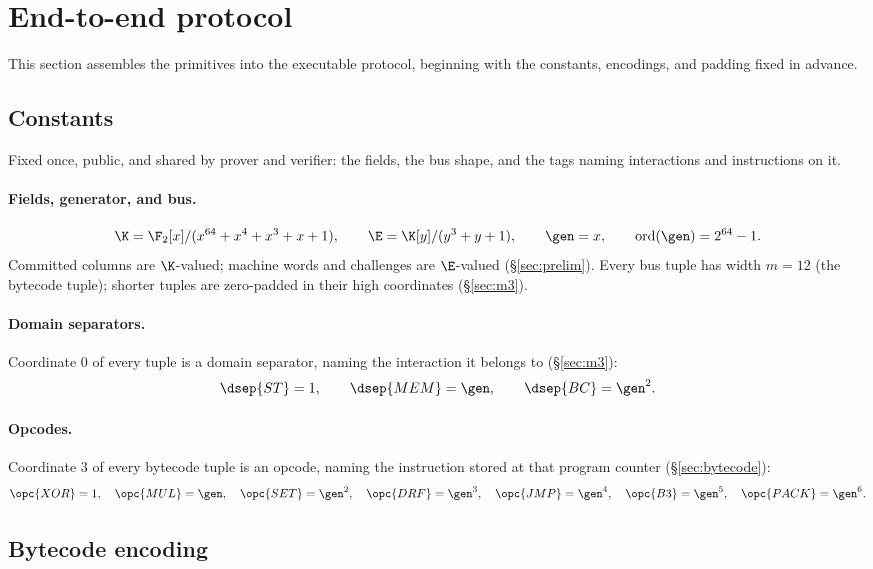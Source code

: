 \section{End-to-end protocol}\label{sec:e2e}

This section assembles the primitives into the executable protocol, beginning with the constants, encodings, and padding fixed in advance.

\subsection{Constants}\label{sec:e2e-const}

Fixed once, public, and shared by prover and verifier: the fields, the bus shape, and the tags naming interactions and instructions on it.

\paragraph{Fields, generator, and bus.}
\[
\K=\F_2[x]/(x^{64}+x^4+x^3+x+1),\qquad
\E=\K[y]/(y^3+y+1),\qquad
\gen=x,\qquad \operatorname{ord}(\gen)=2^{64}-1.
\]
Committed columns are $\K$-valued; machine words and challenges are $\E$-valued (\S\ref{sec:prelim}). Every bus tuple has width $m=12$ (the bytecode tuple); shorter tuples are zero-padded in their high coordinates (\S\ref{sec:m3}).

\paragraph{Domain separators.} Coordinate $0$ of every tuple is a domain separator, naming the interaction it belongs to (\S\ref{sec:m3}):
\[
  \dsep{ST}=1,\qquad \dsep{MEM}=\gen,\qquad \dsep{BC}=\gen^{2}.
\]

\paragraph{Opcodes.} Coordinate $3$ of every bytecode tuple is an opcode, naming the instruction stored at that program counter (\S\ref{sec:bytecode}):
\[
  \opc{XOR}=1,\quad \opc{MUL}=\gen,\quad \opc{SET}=\gen^{2},\quad \opc{DRF}=\gen^{3},\quad \opc{JMP}=\gen^{4},\quad \opc{B3}=\gen^{5},\quad \opc{PACK}=\gen^{6}.
\]

\subsection{Bytecode encoding}\label{sec:e2e-bc}

